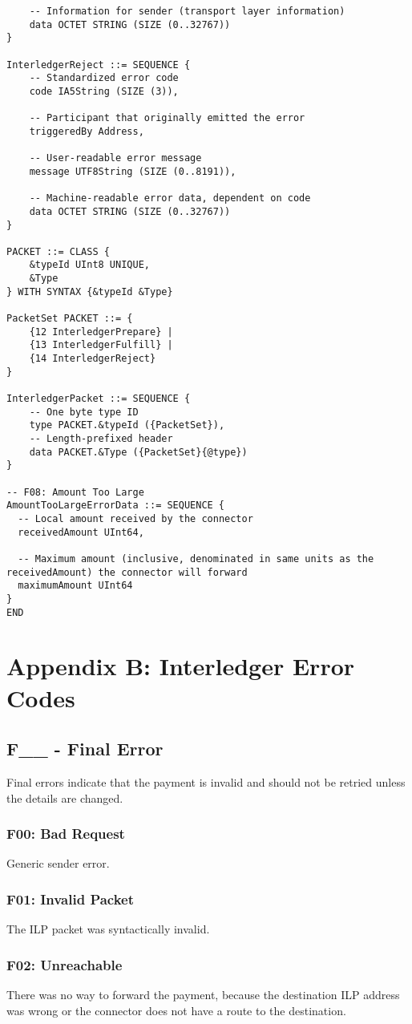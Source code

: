 \documentclass[11pt,twoside,a4paper]{article}
\begin{document}
\begin{verbatim}
    -- Information for sender (transport layer information)
    data OCTET STRING (SIZE (0..32767))
}

InterledgerReject ::= SEQUENCE {
    -- Standardized error code
    code IA5String (SIZE (3)),

    -- Participant that originally emitted the error
    triggeredBy Address,

    -- User-readable error message
    message UTF8String (SIZE (0..8191)),

    -- Machine-readable error data, dependent on code
    data OCTET STRING (SIZE (0..32767))
}

PACKET ::= CLASS {
    &typeId UInt8 UNIQUE,
    &Type
} WITH SYNTAX {&typeId &Type}

PacketSet PACKET ::= {
    {12 InterledgerPrepare} |
    {13 InterledgerFulfill} |
    {14 InterledgerReject}
}

InterledgerPacket ::= SEQUENCE {
    -- One byte type ID
    type PACKET.&typeId ({PacketSet}),
    -- Length-prefixed header
    data PACKET.&Type ({PacketSet}{@type})
}

-- F08: Amount Too Large
AmountTooLargeErrorData ::= SEQUENCE {
  -- Local amount received by the connector
  receivedAmount UInt64,

  -- Maximum amount (inclusive, denominated in same units as the receivedAmount) the connector will forward
  maximumAmount UInt64
}
END
\end{verbatim}
\section{Appendix B: Interledger Error Codes}
\subsection{F\_\_ - Final Error}
Final errors indicate that the payment is invalid and should not be retried unless the details are changed.

\subsubsection{F00: Bad Request}
Generic sender error.

\subsubsection{F01: Invalid Packet}
The ILP packet was syntactically invalid.

\subsubsection{F02: Unreachable}
There was no way to forward the payment, because the destination ILP address was wrong or the connector does not have a route to the destination.
\end{document}
